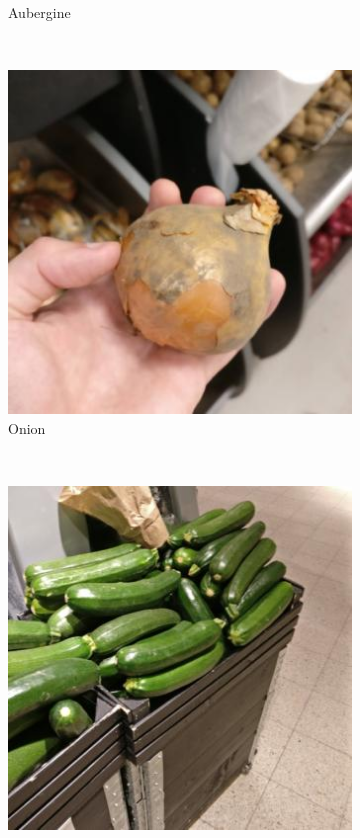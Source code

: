 \begin{figure}[t]
\begin{minipage}[b]{0.47\textwidth}
\begin{subfigure}[t]{0.32\textwidth}
			\caption{Aubergine}
			\label{subfig:real-image-h}
		\end{subfigure}~
		\begin{subfigure}[t]{0.32\textwidth}
			\centering
			\includegraphics[width=\textwidth]{PaperA/dataset-figure/Yellow-Onion_25.jpg}
			\caption{Onion}
			\label{subfig:real-image-j}
		\end{subfigure}~
		\begin{subfigure}[t]{0.32\textwidth}
			\centering
			\includegraphics[width=\textwidth]{PaperA/dataset-figure/Zucchini_015.jpg}

\end{subfigure}
\end{minipage}
\end{figure}
